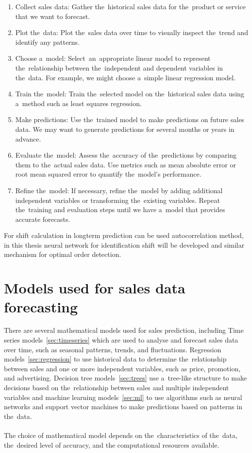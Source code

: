 \begin{enumerate}
    \item Collect sales data: Gather the~historical sales data for the~product or service that we want to forecast.
    \item Plot the~data: Plot the~sales data over time to visually inspect the~trend and identify any patterns.
    \item Choose a~model: Select~an~appropriate linear model to represent the~relationship between the~independent and
    dependent variables in the~data. For example, we might choose a~simple linear regression model.
    \item Train the~model: Train the~selected model on the~historical sales data using a~method such as least squares
    regression.
    \item Make predictions: Use the~trained model to make predictions on future sales data. We may want to generate
    predictions for several months or years in advance.
    \item Evaluate the~model: Assess the~accuracy of the~predictions by comparing them to the~actual sales data.
    Use metrics such as mean absolute error or root mean squared error to quantify the~model's performance.
    \item Refine the~model: If necessary, refine the~model by adding additional independent variables or
    transforming the~existing variables. Repeat the~training and evaluation steps until we have a~model that
    provides accurate forecasts.
\end{enumerate}
For shift calculation in longterm prediction can be used autocorrelation method, in this thesis neural network for
identification shift will be developed and similar mechanism for optimal order detection.

\section{Models used for sales data forecasting}\label{sec:models}
There are several mathematical models used for sales prediction, including Time series models~\ref{sec:timeseries} which are used to analyse and forecast sales data over time, such as seasonal patterns, trends, and fluctuations. Regression models~\ref{sec:regression} to use historical data to determine the~relationship between sales and one or more independent variables, such as price, promotion, and advertising. Decision tree models~\ref{sec:trees} use a~tree-like structure to make decisions based on the~relationship between sales and multiple independent variables and machine learning models~\ref{sec:ml} to use algorithms such as neural networks and support vector machines to make predictions based on patterns in the~data. \\
\\
The choice of mathematical model depends on the~characteristics of the~data, the~desired level of accuracy, and the
computational resources available.
\\

